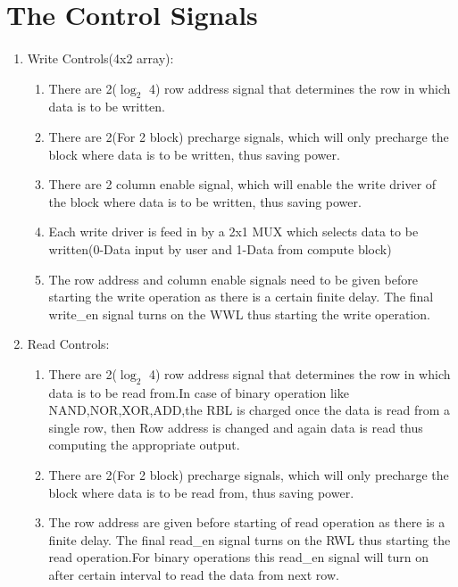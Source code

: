 \section{The Control Signals}
\paragraph{}

\begin{enumerate}
\item Write Controls(4x2 array):
\begin{enumerate}
\item There are 2($\log_2$ 4) row address signal that determines the row in which data is to be written. 
\item There are 2(For 2 block) precharge signals, which will only precharge the block where data is to be written, thus saving power.
\item There are 2 column enable signal, which will enable the write driver of the block where data is to be written, thus saving power. 
\item Each write driver is feed in by a 2x1 MUX which selects data to be written(0-Data input by user and 1-Data from compute block) 
\item The row address and column enable signals need to be given before starting the write operation as there is a certain finite delay. The final write\_en signal turns on the WWL thus starting the write operation.  
\end{enumerate}
\item Read  Controls:
\begin{enumerate}
\item There are 2($\log_2$ 4) row address signal that determines the row in which data is to be read from.In case of binary operation like NAND,NOR,XOR,ADD,the RBL is charged once the data is read from a single row, then Row address is changed and again data is read thus computing the appropriate output.  
\item There are 2(For 2 block) precharge signals, which will only precharge the block where data is to be read from, thus saving power.
\item The row address are given before starting of read operation as there is a finite delay. The final read\_en signal turns on the RWL thus starting the read operation.For binary operations this read\_en signal will turn on after certain interval to read the data from next row.  
\end{enumerate}

\end{enumerate}
